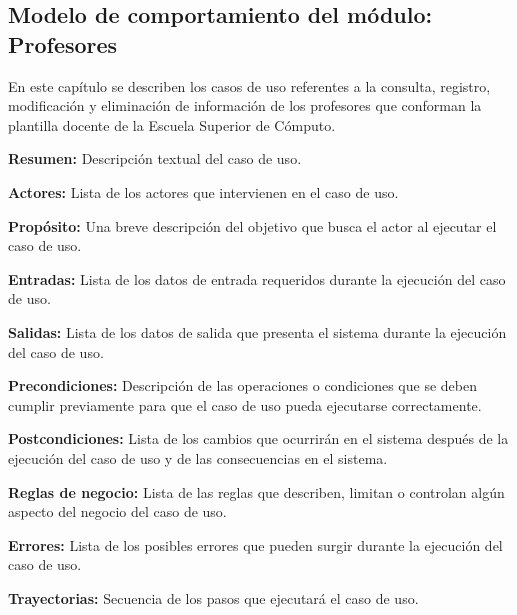 \newpage
\subsection{Modelo de comportamiento del módulo:  Profesores \label{chp:modeloComportamientoProfesores}}

En este capítulo se describen los casos de uso referentes a la consulta, registro, modificación y eliminación de información de los profesores que conforman la plantilla docente de la Escuela Superior de Cómputo. \bigskip

\begin{objetivos}
	\item {\bf Resumen:} Descripción textual del caso de uso.
	\item {\bf Actores:} Lista de los actores que intervienen en el caso de uso.
	\item {\bf Propósito:} Una breve descripción del objetivo que busca el actor al ejecutar el caso de uso.
	\item {\bf Entradas:} Lista de los datos de entrada requeridos durante la ejecución del caso de uso.
	\item {\bf Salidas:} Lista de los datos de salida que presenta el sistema durante la ejecución del caso de uso.
	\item {\bf Precondiciones:} Descripción de las operaciones o condiciones que se deben cumplir previamente para que el caso de uso pueda ejecutarse correctamente.
	\item {\bf Postcondiciones:} Lista de los cambios que ocurrirán en el sistema después de la ejecución del caso de uso y de las consecuencias en el sistema.
	\item {\bf Reglas de negocio:} Lista de las reglas que describen, limitan o controlan algún aspecto del negocio del caso de uso.
	\item {\bf Errores:} Lista de los posibles errores que pueden surgir durante la ejecución del caso de uso.
	\item {\bf Trayectorias:} Secuencia de los pasos que ejecutará el caso de uso.
\end{objetivos}

